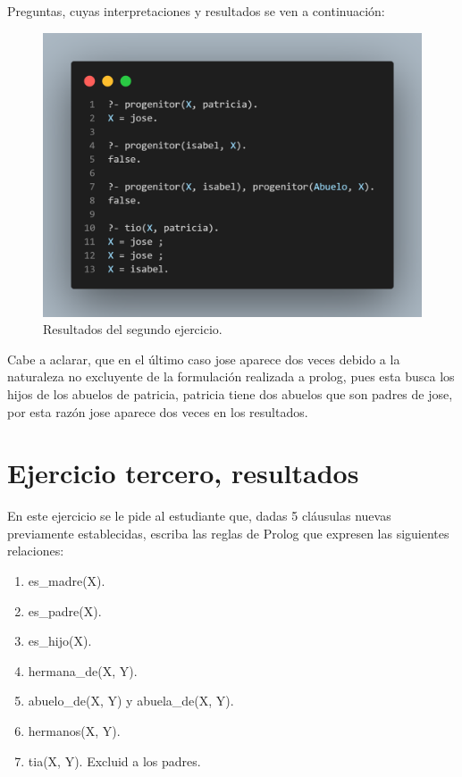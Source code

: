 \documentclass{article}
\begin{document}
Preguntas, cuyas interpretaciones y resultados se ven a continuación: 
\begin{figure}[h]
    \centering
    \includegraphics[width=1\textwidth]{./img/results_2.png}
    \caption{Resultados del segundo ejercicio.}
    \label{fig:results_2}
\end{figure}

Cabe a aclarar, que en el último caso jose aparece dos veces debido a la naturaleza no excluyente de la formulación realizada a prolog, pues esta busca los hijos de los abuelos de patricia, patricia tiene dos abuelos que son padres de jose, por esta razón jose aparece dos veces en los resultados.


\section*{Ejercicio tercero, resultados}
En este ejercicio se le pide al estudiante que, dadas 5 cláusulas nuevas previamente establecidas, escriba las reglas de Prolog que expresen las siguientes relaciones:

\begin{enumerate}
    \item es\_madre(X).
    \item es\_padre(X).
    \item es\_hijo(X).
    \item hermana\_de(X, Y).
    \item abuelo\_de(X, Y) y abuela\_de(X, Y).
    \item hermanos(X, Y).
    \item tia(X, Y). Excluid a los padres.
\end{enumerate}
\end{document}
